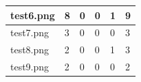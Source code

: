 \documentclass[a4paper,12pt]{article}
\begin{document}
\begin{table}[H]
\begin{tabular}{llllll}
		\multicolumn{1}{|l|}{test6.png}                                                                        & \multicolumn{1}{l|}{8}                                                                 & \multicolumn{1}{l|}{0}                                                                  & \multicolumn{1}{l|}{0}                                                                  & \multicolumn{1}{l|}{1}                                                                                      & \multicolumn{1}{l|}{9}                                                                                             \\ \hline
		\multicolumn{1}{|l|}{test7.png}                                                                        & \multicolumn{1}{l|}{3}                                                                 & \multicolumn{1}{l|}{0}                                                                  & \multicolumn{1}{l|}{0}                                                                  & \multicolumn{1}{l|}{0}                                                                                      & \multicolumn{1}{l|}{3}                                                                                             \\ \hline
		\multicolumn{1}{|l|}{test8.png}                                                                        & \multicolumn{1}{l|}{2}                                                                 & \multicolumn{1}{l|}{0}                                                                  & \multicolumn{1}{l|}{0}                                                                  & \multicolumn{1}{l|}{1}                                                                                      & \multicolumn{1}{l|}{3}                                                                                             \\ \hline
		\multicolumn{1}{|l|}{test9.png}                                                                        & \multicolumn{1}{l|}{2}                                                                 & \multicolumn{1}{l|}{0}                                                                  & \multicolumn{1}{l|}{0}                                                                  & \multicolumn{1}{l|}{0}                                                                                      & \multicolumn{1}{l|}{2}                                                                                             \\ \hline

\end{tabular}
\end{table}
\end{document}

